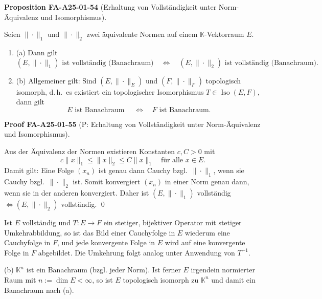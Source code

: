 \documentclass[10pt, letterpaper]{article}
\newcommand{\CustomHeading}[3]{%
  \par\medskip\noindent%
  \textbf{#1 #2} \textnormal{(#3)}.\enskip%
}
\newenvironment{PROP}[2]{\begin{unitbox}\CustomHeading{Proposition}{#1}{#2}}{\end{unitbox}}
\newenvironment{PROOF}[2]{\begin{unitbox}\CustomHeading{Proof}{#1}{#2}}{\end{unitbox}}
\begin{document}
\begin{PROP}{FA-A25-01-54}{Erhaltung von Vollständigkeit unter Norm-Äquivalenz und Isomorphismus}
Seien $\|\cdot\|_{1}$ und $\|\cdot\|_{2}$ zwei äquivalente Normen auf einem $\mathbb{K}$-Vektorraum $E$.

\begin{enumerate}
\item (a) Dann gilt
\[
\left(E,\|\cdot\|_{1}\right) \text{ ist vollständig (Banachraum)}
\quad \Longleftrightarrow \quad
\left(E,\|\cdot\|_{2}\right) \text{ ist vollständig (Banachraum)}.
\]

\item (b) Allgemeiner gilt: Sind $(E,\|\cdot\|_{E})$ und $(F,\|\cdot\|_{F})$ topologisch isomorph, d.\,h.\ es existiert ein topologischer Isomorphismus $T\in\operatorname{Iso}(E,F)$, dann gilt
\[
E \text{ ist Banachraum } \quad \Longleftrightarrow \quad F \text{ ist Banachraum.}
\]
\end{enumerate}
\end{PROP}


\begin{PROOF}{FA-A25-01-55}{P: Erhaltung von Vollständigkeit unter Norm-Äquivalenz und Isomorphismus}
Aus der Äquivalenz der Normen existieren Konstanten $c,C>0$ mit
\[
c\|x\|_{1}\le \|x\|_{2}\le C\|x\|_{1}\quad \text{für alle } x\in E.
\]
Damit gilt: Eine Folge $(x_n)$ ist genau dann Cauchy bzgl.\ $\|\cdot\|_{1}$, wenn sie Cauchy bzgl.\ $\|\cdot\|_{2}$ ist.  
Somit konvergiert $(x_n)$ in einer Norm genau dann, wenn sie in der anderen konvergiert.  
Daher ist $(E,\|\cdot\|_{1})$ vollständig $\iff (E,\|\cdot\|_{2})$ vollständig. \qed

Ist $E$ vollständig und $T:E\to F$ ein stetiger, bijektiver Operator mit stetiger Umkehrabbildung, so ist das Bild einer Cauchyfolge in $E$ wiederum eine Cauchyfolge in $F$, und jede konvergente Folge in $E$ wird auf eine konvergente Folge in $F$ abgebildet.  
Die Umkehrung folgt analog unter Anwendung von $T^{-1}$.
\end{PROOF}





(b) $\mathbb{K}^{n}$ ist ein Banachraum (bzgl. jeder Norm). Ist ferner $E$ irgendein normierter Raum mit $n:=\operatorname{dim} E<\infty$, so ist $E$ topologisch isomorph zu $\mathbb{K}^{n}$ und damit ein Banachraum nach (a).\\
\end{document}

